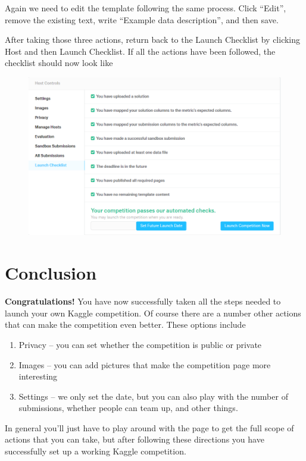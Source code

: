 \documentclass{article}
\begin{document}
Again we need to edit the template following the same process. Click
``Edit'', remove the existing text, write ``Example data description'',
and then save.

After taking those three actions, return back to the Launch Checklist by
clicking Host and then Launch Checklist. If all the actions have been
followed, the checklist should now look like

\begin{figure}[H]
    \centering
    \includegraphics[width=\linewidth]{figures/launch-checklist5.PNG}
\end{figure}

\section{Conclusion}\label{conclusion}

\textbf{Congratulations!} You have now successfully taken all the steps
needed to launch your own Kaggle competition. Of course there are a
number other actions that can make the competition even better. These
options include

\begin{enumerate}
\item
  Privacy -- you can set whether the competition is public or private
\item
  Images -- you can add pictures that make the competition page more
  interesting
\item
  Settings -- we only set the date, but you can also play with the
  number of submissions, whether people can team up, and other things.
\end{enumerate}

In general you'll just have to play around with the page to get the full
scope of actions that you can take, but after following these directions
you have successfully set up a working Kaggle competition.
\end{document}
